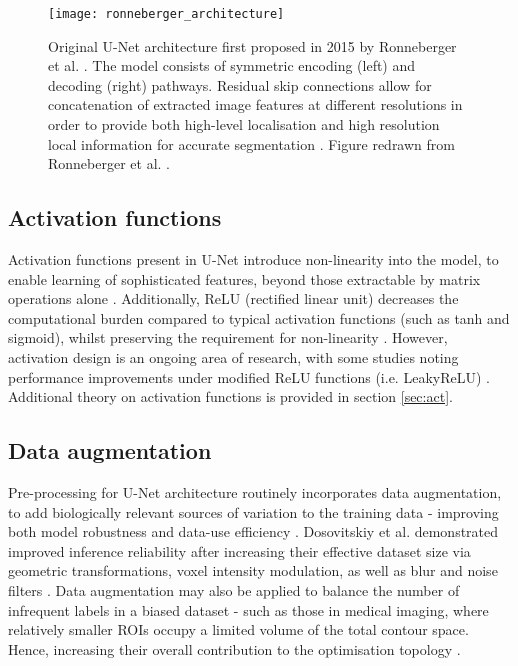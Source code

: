 \begin{figure}[h]
	\begin{center}
		\texttt{[image: ronneberger\_architecture]}
		\caption{Original U-Net architecture first proposed in 2015 by Ronneberger
      et al. \cite{Ronneberger_2015}. The model consists of symmetric encoding
      (left) and decoding (right) pathways. Residual skip connections allow for
      concatenation of extracted image features at different resolutions in
      order to provide both high-level localisation and high resolution local
      information for accurate segmentation \cite{Nemoto_2020}. Figure redrawn
      from Ronneberger et al. \cite{Ronneberger_2015}.}
		\label{fig:unet}
	\end{center}
\end{figure}

\subsection{Activation functions}

Activation functions present in U-Net introduce non-linearity into the model, to
enable learning of sophisticated features, beyond those extractable by matrix
operations alone \cite{Maier2019}. Additionally, ReLU (rectified linear
unit) decreases the computational burden compared to typical activation
functions (such as tanh and sigmoid), whilst preserving the requirement for
non-linearity \cite{Chigozie2018}. However, activation design is an ongoing area
of research, with some studies noting performance improvements under modified
ReLU functions (i.e. LeakyReLU) \cite{Lin2018}. Additional theory on activation
functions is provided in section \ref{sec:act}.

\subsection{Data augmentation}
Pre-processing for U-Net architecture routinely incorporates data augmentation,
to add biologically relevant sources of variation to the training data
\cite{Maier2019, Hesamian2019, Lundervold2019} - improving both model robustness
and data-use efficiency \cite{Ronneberger_2015}. Dosovitskiy et al. demonstrated
improved inference reliability after increasing their effective dataset size via
geometric transformations, voxel intensity modulation, as well as blur and noise
filters \cite{Dosovitskiy2014}. Data augmentation may also be applied to balance
the number of infrequent labels in a biased dataset \cite{Maier2019} - such as
those in medical imaging, where relatively smaller ROIs occupy a limited volume
of the total contour space. Hence, increasing their overall contribution to the
optimisation topology \cite{Khan2019}.


